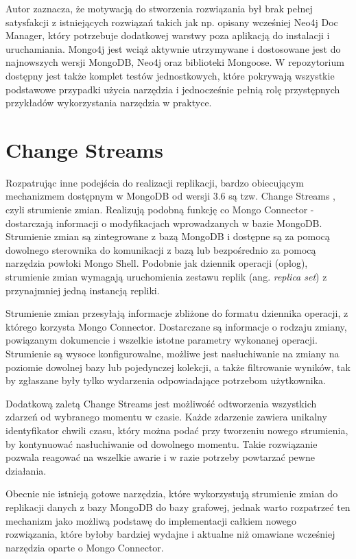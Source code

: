 \documentclass[a4paper,twoside,12pt]{book}
\newcommand{\obcy}[1]{\emph{#1}}
\newcommand{\ang}[1]{{\selectlanguage{british}\obcy{#1}}}
\begin{document}
Autor zaznacza, że motywacją do stworzenia rozwiązania był brak pełnej satysfakcji z istniejących rozwiązań takich jak np. opisany wcześniej Neo4j Doc Manager, który potrzebuje dodatkowej warstwy poza aplikacją do instalacji i uruchamiania. Mongo4j jest wciąż aktywnie utrzymywane i dostosowane jest do najnowszych wersji MongoDB, Neo4j oraz biblioteki Mongoose. W repozytorium dostępny jest także komplet testów jednostkowych, które pokrywają wszystkie podstawowe przypadki użycia narzędzia i jednocześnie pełnią rolę przystępnych przykładów wykorzystania narzędzia w praktyce.

\vspace{1.6cm}

\section{Change Streams}

Rozpatrując inne podejścia do realizacji replikacji, bardzo obiecującym mechanizmem dostępnym w MongoDB od wersji 3.6 są tzw. Change Streams \cite{bib:change-streams, bib:change-streams-manual}, czyli strumienie zmian. Realizują podobną funkcję co Mongo Connector - dostarczają informacji o modyfikacjach wprowadzanych w bazie MongoDB. Strumienie zmian są zintegrowane z bazą MongoDB i dostępne są za pomocą dowolnego sterownika do komunikacji z bazą lub bezpośrednio za pomocą narzędzia powłoki Mongo Shell. Podobnie jak dziennik operacji (oplog), strumienie zmian wymagają uruchomienia zestawu replik (ang. \ang{replica set}) z przynajmniej jedną instancją repliki. 

Strumienie zmian przesyłają informacje zbliżone do formatu dziennika operacji, z którego korzysta Mongo Connector. Dostarczane są informacje o rodzaju zmiany, powiązanym dokumencie i wszelkie istotne parametry wykonanej operacji. Strumienie są wysoce konfigurowalne, możliwe jest nasłuchiwanie na zmiany na poziomie dowolnej bazy lub pojedynczej kolekcji, a także filtrowanie wyników, tak by zgłaszane były tylko wydarzenia odpowiadające potrzebom użytkownika. 

Dodatkową zaletą Change Streams jest możliwość odtworzenia wszystkich zdarzeń od wybranego momentu w czasie. Każde zdarzenie zawiera unikalny identyfikator chwili czasu, który można podać przy tworzeniu nowego strumienia, by kontynuować nasłuchiwanie od dowolnego momentu. Takie rozwiązanie pozwala reagować na wszelkie awarie i w razie potrzeby powtarzać pewne działania.

Obecnie nie istnieją gotowe narzędzia, które wykorzystują strumienie zmian do replikacji danych z bazy MongoDB do bazy grafowej, jednak warto rozpatrzeć ten mechanizm jako możliwą podstawę do implementacji całkiem nowego rozwiązania, które byłoby bardziej wydajne i aktualne niż omawiane wcześniej narzędzia oparte o Mongo Connector.  
\end{document}

